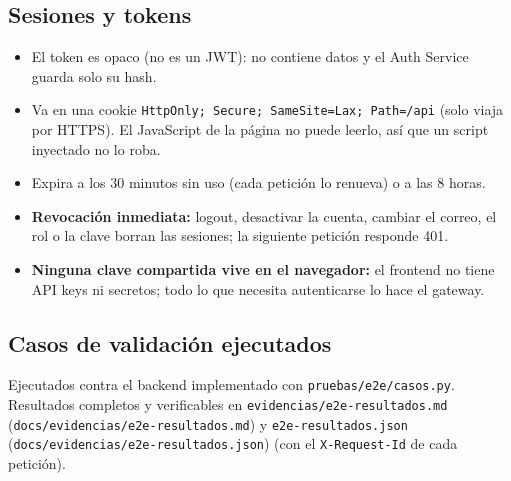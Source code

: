 \subsection{Sesiones y tokens}

\begin{itemize}[nosep,leftmargin=*]
\item El token es opaco (no es un JWT): no contiene datos y el Auth Service guarda solo su hash.
\item Va en una cookie \texttt{HttpOnly; Secure; SameSite=\allowbreak{}Lax; Path=\allowbreak{}/\allowbreak{}api} (solo viaja por HTTPS). El JavaScript de la página no puede leerlo, así que un script inyectado no lo roba.
\item Expira a los 30 minutos sin uso (cada petición lo renueva) o a las 8 horas.
\item \textbf{Revocación inmediata:} logout, desactivar la cuenta, cambiar el correo, el rol o la clave borran las sesiones; la siguiente petición responde 401.
\item \textbf{Ninguna clave compartida vive en el navegador:} el frontend no tiene API keys ni secretos; todo lo que necesita autenticarse lo hace el gateway.
\end{itemize}

\subsection{Casos de validación ejecutados}

Ejecutados contra el backend implementado con \texttt{pruebas/\allowbreak{}e2e/\allowbreak{}casos.\allowbreak{}py}. Resultados completos y verificables en \texttt{evidencias/\allowbreak{}e2e-\allowbreak{}resultados.\allowbreak{}md} (\texttt{docs/\allowbreak{}evidencias/\allowbreak{}e2e-\allowbreak{}resultados.\allowbreak{}md}) y \texttt{e2e-\allowbreak{}resultados.\allowbreak{}json} (\texttt{docs/\allowbreak{}evidencias/\allowbreak{}e2e-\allowbreak{}resultados.\allowbreak{}json}) (con el \texttt{X-\allowbreak{}Request-\allowbreak{}Id} de cada petición).


